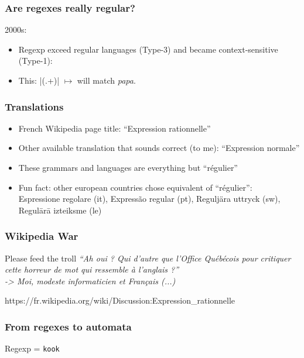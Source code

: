 \documentclass[aspectratio=169,xcolor=table]{beamer}
\newcommand{\ctexttt}[1]{\colorbox{cverbbg}{\texttt{#1}}}
\begin{document}
\begin{frame}[fragile]
  \frametitle{Are regexes really regular?}
  2000s:
  \begin{itemize}
  \item Regexp exceed regular languages (Type-3) and became
    context-sensitive (Type-1):
  \item This: \cverb|(.+)\1| $\mapsto$ will match \textit{papa}.
  \end{itemize}
\end{frame}


\begin{frame}
  \frametitle{Translations}
  \begin{itemize}
  \item French Wikipedia page title: ``Expression rationnelle''
  \item Other available translation that sounds correct (to me):
    ``Expression normale''
  \item These grammars and languages are everything but ``r\'egulier''
  \item Fun fact: other european countries chose equivalent of
    ``r\'egulier'': \\ Espressione regolare (it), Express\~ao regular
    (pt), Regulj\"ara uttryck (sw), Regul\={a}r\={a} izteiksme (le)
  \end{itemize}
\end{frame}


\begin{frame}
  \frametitle{Wikipedia War}
  \begin{block}{Please feed the troll}
    \textit{``Ah oui ? Qui d'autre que l'Office Qu\'eb\'ecois pour critiquer cette
      horreur de mot qui ressemble à l'anglais ?'' \\ -> Moi, modeste
      informaticien et Fran\c{c}ais (...)}
  \end{block}
  https://fr.wikipedia.org/wiki/Discussion:Expression\_rationnelle
\end{frame}


\begin{frame}
  \frametitle{From regexes to automata}
  Regexp = \ctexttt{kook}
  \par
  \par
  \begin{center}
  \end{center}
\end{frame}
\end{document}

